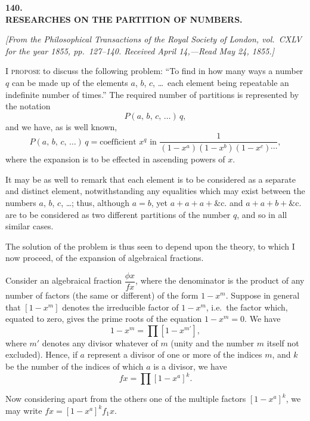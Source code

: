 \documentclass[11pt]{article}
\begin{document}
\begin{center}
{\Large\bfseries 140.}\\[1ex]
{\large\bfseries RESEARCHES ON THE PARTITION OF NUMBERS.}
\end{center}

\noindent\textit{[From the Philosophical Transactions of the Royal Society of London, vol.~CXLV for the year 1855, pp.~127--140. Received April 14,---Read May 24, 1855.]}

\medskip

\noindent I \textsc{propose} to discuss the following problem: ``To find in how many ways a number $q$ can be made up of the elements $a$, $b$, $c$, \ldots\ each element being repeatable an indefinite number of times.'' The required number of partitions is represented by the notation
\[
P(a,\, b,\, c,\,\ldots)\,q,
\]
and we have, as is well known,
\[
P(a,\, b,\, c,\,\ldots)\,q = \text{coefficient } x^q \text{ in } \frac{1}{(1-x^a)(1-x^b)(1-x^c)\cdots},
\]
where the expansion is to be effected in ascending powers of $x$.

It may be as well to remark that each element is to be considered as a separate and distinct element, notwithstanding any equalities which may exist between the numbers $a$, $b$, $c$, \ldots; thus, although $a=b$, yet $a+a+a+\&\text{c.}$ and $a+a+b+\&\text{c.}$ are to be considered as two different partitions of the number $q$, and so in all similar cases.

The solution of the problem is thus seen to depend upon the theory, to which I now proceed, of the expansion of algebraical fractions.

Consider an algebraical fraction $\dfrac{\phi x}{f x}$, where the denominator is the product of any number of factors (the same or different) of the form $1-x^m$. Suppose in general that $[1-x^m]$ denotes the irreducible factor of $1-x^m$, i.e.\ the factor which, equated to zero, gives the prime roots of the equation $1-x^m=0$. We have
\[
1-x^m = \prod [1-x^{m'}],
\]
where $m'$ denotes any divisor whatever of $m$ (unity and the number $m$ itself not excluded). Hence, if $a$ represent a divisor of one or more of the indices $m$, and $k$ be the number of the indices of which $a$ is a divisor, we have
\[
f x = \prod [1-x^a]^k.
\]

Now considering apart from the others one of the multiple factors $[1-x^a]^k$, we may write $f x = [1-x^a]^k f_1 x$.
\end{document}
